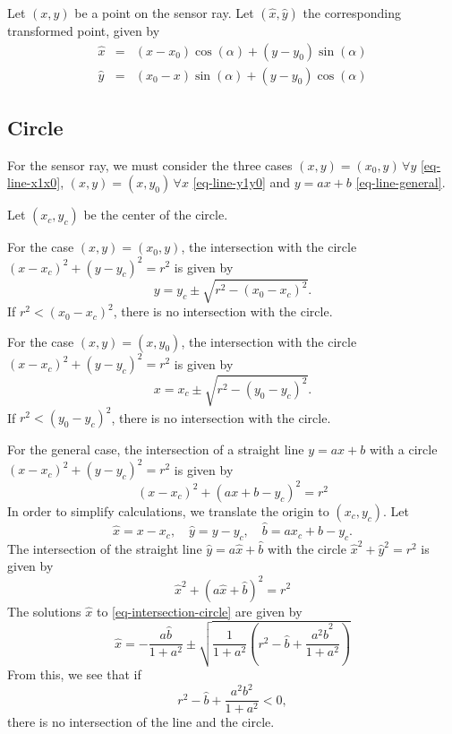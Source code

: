 \documentclass[11pt]{article}
\newcommand{\bhat}{{\hat{b}}}
\newcommand{\xhat}{{\hat{x}}}
\newcommand{\yhat}{{\hat{y}}}
\begin{document}
Let $(x, y)$ be a point on the sensor ray. Let $(\xhat, \yhat)$ the
corresponding transformed point, given by
\begin{eqnarray}
    \xhat &=& (x - x_0) \cos(\alpha) + (y - y_0) \sin(\alpha) \\
    \yhat &=& (x_0 - x) \sin(\alpha) + (y - y_0) \cos(\alpha)
\end{eqnarray}

\subsection{Circle}
\label{sec-intersection-circle}
For the sensor ray, we must consider the three cases $(x,y)=(x_0,y)\,\forall y$
\eqref{eq-line-x1x0}, $(x,y)=(x,y_0)\,\forall x$ \eqref{eq-line-y1y0} and $y=ax+b$
\eqref{eq-line-general}.

Let $(x_c, y_c)$ be the center of the circle.

For the case $(x,y)=(x_0, y)$, the intersection with the circle
$(x-x_c)^2+(y-y_c)^2=r^2$ is given by
\begin{equation}
    y = y_c \pm\sqrt{r^2 - (x_0-x_c)^2}.
\end{equation}
If $r^2 < (x_0-x_c)^2$, there is no intersection with the circle.

For the case $(x,y)=(x, y_0)$, the intersection with the circle
$(x-x_c)^2+(y-y_c)^2=r^2$ is given by
\begin{equation}
    x = x_c \pm\sqrt{r^2 - (y_0-y_c)^2}.
\end{equation}
If $r^2 < (y_0-y_c)^2$, there is no intersection with the circle.

For the general case, the intersection of a
straight line $y=ax+b$ with a circle $(x-x_c)^2+(y-y_c)^2=r^2$ is given by
\begin{equation}
    (x-x_c)^2 + (ax+b - y_c)^2 = r^2
\end{equation}
In order to simplify calculations, we translate the origin to $(x_c, y_c)$. Let
\begin{equation}
    \xhat = x-x_c,\quad \yhat = y-y_c,\quad \bhat = ax_c + b - y_c.
\end{equation}
The intersection of the straight line $\yhat = a\xhat + \bhat$ with the circle
$\xhat^2 + \yhat^2 = r^2$ is given by
\begin{equation}
    \xhat^2 + (a\xhat + \bhat)^2 = r^2 \label{eq-intersection-circle}
\end{equation}
The solutions $\xhat$ to \eqref{eq-intersection-circle} are given by
\begin{equation}
    \xhat = -\frac{a\bhat}{1+a^2}\pm
        \sqrt{\frac{1}{1+a^2}\left(r^2-\bhat+\frac{a^2 \bhat^2}{1+a^2}\right)}
\end{equation}
From this, we see that if
\begin{equation}
    r^2-\bhat+\frac{a^2 b^2}{1+a^2} < 0,
\end{equation}
there is no intersection of the line and the circle.
\end{document}
